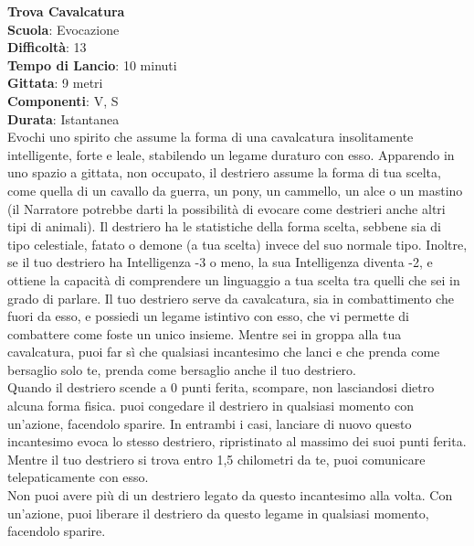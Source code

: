 \begin{multicols}{2}
\medskip\textbf{Trova Cavalcatura}\\
\textbf{Scuola}: Evocazione\\
\textbf{Difficoltà}: 13\\
\textbf{Tempo di Lancio}: 10 minuti\\
\textbf{Gittata}: 9 metri\\
\textbf{Componenti}: V, S\\
\textbf{Durata}: Istantanea\\
Evochi uno spirito che assume la forma di una cavalcatura insolitamente intelligente, forte e leale, stabilendo un legame duraturo con esso. Apparendo in uno spazio a gittata, non occupato, il destriero assume la forma di tua scelta, come quella di un cavallo da guerra, un pony, un cammello, un alce o un mastino (il Narratore potrebbe darti la possibilità di evocare come destrieri anche altri tipi di animali). Il destriero ha le statistiche della forma scelta, sebbene sia di tipo celestiale, fatato o demone (a tua scelta) invece del suo normale tipo. Inoltre, se il tuo destriero ha Intelligenza -3 o meno, la sua Intelligenza diventa -2, e ottiene la capacità di comprendere un linguaggio a tua scelta tra quelli che sei in grado di parlare. Il tuo destriero serve da cavalcatura, sia in combattimento che fuori da esso, e possiedi un legame istintivo con esso, che vi permette di combattere come foste un unico insieme. Mentre sei in groppa alla tua cavalcatura, puoi far sì che qualsiasi incantesimo che lanci e che prenda come bersaglio solo te, prenda come bersaglio anche il tuo destriero.\\
Quando il destriero scende a 0 punti ferita, scompare, non lasciandosi dietro alcuna forma fisica. puoi congedare il destriero in qualsiasi momento con un'azione, facendolo sparire. In entrambi i casi, lanciare di nuovo questo incantesimo evoca lo stesso destriero, ripristinato al massimo dei suoi punti ferita. Mentre il tuo destriero si trova entro 1,5 chilometri da te, puoi comunicare telepaticamente con esso.\\
Non puoi avere più di un destriero legato da questo incantesimo alla volta. Con un'azione, puoi liberare il destriero da questo legame in qualsiasi momento, facendolo sparire.


\end{multicols}
